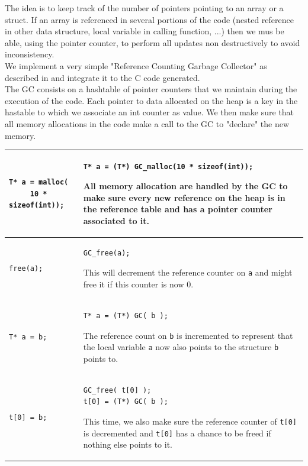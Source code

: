 \documentclass[12pt,a4paper,titlepage]{article}
\newcommand{\cl}[1]{\texttt{#1}}
\begin{document}
The idea is to keep track of the number of pointers pointing to an array or a struct. If an array is referenced in several portions of the code (nested reference in other data structure, local variable in calling function, ...) then we mus be able, using the pointer counter, to perform all updates non destructively to avoid inconsistency.\\

We implement a very simple "Reference Counting Garbage Collector" as described in \cite{jonesgarbage} and integrate it to the C code generated.\\

The GC consists on a hashtable of pointer counters that we maintain during the execution of the code. Each pointer to data allocated on the heap is a key in the hastable to which we associate an int counter as value. We then make sure that all memory allocations in the code make a call to the GC to "declare" the new memory.

\begin{tabular}{|p{5cm}|p{11cm}|}
\hline
\begin{lstlisting}
T* a = malloc(
     10 * sizeof(int));
\end{lstlisting} & \begin{lstlisting}
T* a = (T*) GC_malloc(10 * sizeof(int));
\end{lstlisting}
All memory allocation are handled by the GC to make sure every new reference on the heap is in the reference table and has a pointer counter associated to it.
\\ \hline
\begin{lstlisting}
free(a);
\end{lstlisting} & \begin{lstlisting}
GC_free(a);
\end{lstlisting}
This will decrement the reference counter on \cl{a} and might free it if this counter is now 0. \\ \hline
\begin{lstlisting}
T* a = b;
\end{lstlisting} & \begin{lstlisting}
T* a = (T*) GC( b );
\end{lstlisting}
The reference count on \cl{b} is incremented to represent that the local variable \cl{a} now also points to the structure \cl{b} points to.\\ \hline
\begin{lstlisting}
t[0] = b;
\end{lstlisting} & \begin{lstlisting}
GC_free( t[0] );
t[0] = (T*) GC( b );
\end{lstlisting}
This time, we also make sure the reference counter of \cl{t[0]} is decremented and \cl{t[0]} has a chance to be freed if nothing else points to it.\\ \hline
\end{tabular}
\end{document}
